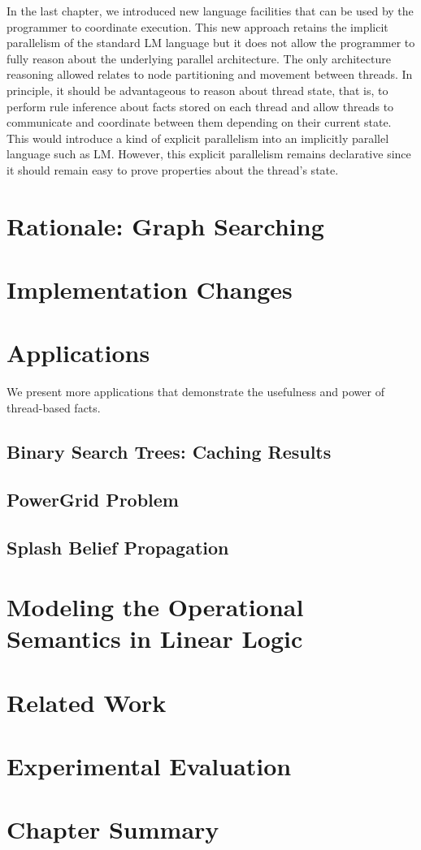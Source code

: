 In the last chapter, we introduced new language facilities that can be used by
the programmer to coordinate execution. This new approach retains the implicit
parallelism of the standard LM language but it does not allow the programmer to
fully reason about the underlying parallel architecture. The only architecture
reasoning allowed relates to node partitioning and movement between threads. In
principle, it should be advantageous to reason about thread state, that is, to
perform rule inference about facts stored on each thread and allow threads to
communicate and coordinate between them depending on their current state. This
would introduce a kind of explicit parallelism into an implicitly parallel
language such as LM. However, this explicit parallelism remains declarative
since it should remain easy to prove properties about the thread's state.

\section{Rationale: Graph Searching}


\section{Implementation Changes}


\section{Applications}

We present more applications that demonstrate the usefulness and power of thread-based facts.

\subsection{Binary Search Trees: Caching Results}


\subsection{PowerGrid Problem}


\subsection{Splash Belief Propagation}


\section{Modeling the Operational Semantics in Linear Logic}


\section{Related Work}


\section{Experimental Evaluation}

\section{Chapter Summary}

